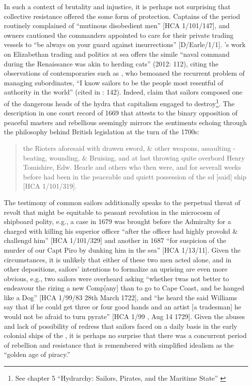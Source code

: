 In such a context of brutality and injustice, it is perhaps not surprising that collective resistance offered the  some form of protection. Captains of the period routinely complained of “mutinous disobedient men” [HCA 1/101/147], and owners cautioned the commanders appointed to care for their private trading vessels to “be always on your guard against insurrections” [D/Earle/1/1]. \citeauthor{Bicheno2012}’s work on Elizabethan trading and politics at sea offers the simile “naval command during the Renaissance was akin to herding cats” (2012: 112), citing the observations of contemporaries such as , who bemoaned the recurrent problem of managing subordinates, “I know sailors to be the people most resentful of authority in the world” (cited in \citealt{Bicheno2012}: 142). Indeed, \citet{LinebaughRediker2000} claim that sailors composed one of the dangerous heads of the hydra that capitalism engaged to destroy\footnote{See chapter 5 “Hydrarchy: Sailors, Pirates, and the Maritime State” \citet[143--173]{LinebaughRediker2000}}. The description in one court record of 1669 that attests to the binary opposition of peaceful masters and rebellious  seemingly mirrors the sentiments echoing through the philosophy behind British legislation at the turn of the 1700s:

\begin{quotation}
the Rioters aforesaid with drawen sword, \& other weapons, assaulting - beating, wounding, \& Bruising, and at last throwing quite overbord Henry Tomishire, Edw. Hearle and others who then were, and for severall weeks before had been in the peaceable and quiett possession of the sd [said] ship [HCA 1/101/319]. 
\end{quotation}

The testimony of common sailors additionally speaks to the perpetual threat of revolt that might be equitable to peasant revolution in the microcosm of shipboard polity, e.g., a case in 1679 was brought before the Admiralty for a  charged with killing his superior officer “after the officer had highly provokd \& challengd him” [HCA 1/101/329] and another in 1687 “for suspicion of the murder of our Capt Piro by dunking him in the sea” [HCA 1/13/11]. Given the circumstances, it is unlikely that either of these two men acted alone, and in other depositions, sailors’ intentions to formalize an uprising are even more obvious, e.g., two sailors were overheard asking “whether twas not better to endeavour the rizing a new Comp[any] than to go to Cape Coast, and be hanged like a Dog” [HCA 1/99/83 28th March {1722}], and “he heard the said Williams say that if he could get three or four good hands and an artist [a tradesman] he would not be afraid to turn pyrate” [HCA 1/99 , Aug 14 1729]. Given the abuses and lack of possibility of redress that sailors faced on a daily basis in the early colonial ships of the , it is perhaps no surprise that there was a concurrent period of rebellion and resistance that is remembered with simplified idealism as the “golden age of piracy.”

